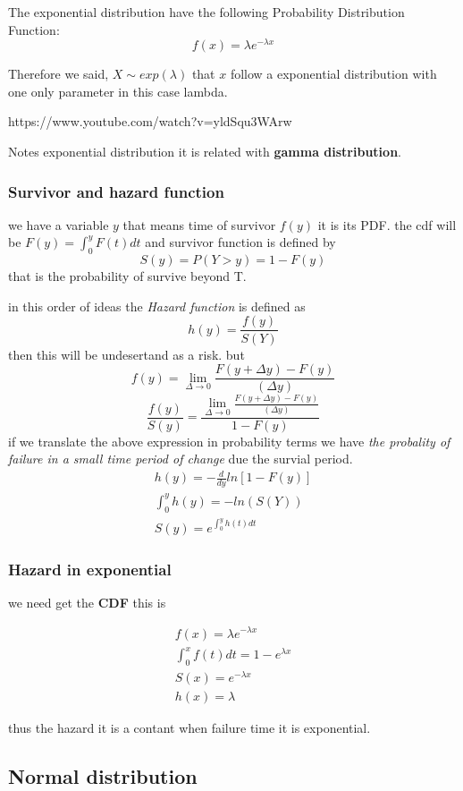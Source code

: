 \documentclass[10pt,a4paper]{article}
\begin{document}
The exponential distribution have the following Probability Distribution Function:
$$f(x)=\lambda e^{- \lambda x}$$
 
Therefore we said, $ X \sim exp(\lambda)$ that $x$ follow a exponential distribution
with one only parameter in this case lambda. 

https://www.youtube.com/watch?v=yldSqu3WArw

Notes exponential distribution it is related with \textbf{gamma distribution}.

\subsubsection{Survivor and hazard function}
we have a variable $y$ that means time of survivor $f(y)$  it is its PDF.
the cdf will be  $F(y)=\int_{0}^{y} F(t)dt$
and survivor function is defined by 
$$S(y)=P(Y>y)= 1-F(y)$$ 
that is the probability of survive beyond T.

in this order of ideas the \textit{Hazard function } is defined as 
$$ h(y)=\frac{f(y)}{S(Y)}$$
then this will be undesertand as a risk.
but 
$$ f(y)=   \lim_{\Delta \to 0}   \frac{   F(y + \Delta y) - F(y)}{(\Delta y)}$$
$$\frac{f(y)}{S(y)}= \frac{\lim_{\Delta \to 0}   \frac{ F(y + \Delta y) - F(y)}{(\Delta y)}}{1-F(y)}$$
if we translate the above expression in probability terms we have \textit{ the probality of failure in a small time period of change} due the survial period.
\begin{eqnarray}
 h(y) =-\frac{d}{dy}ln[1-F(y)] \\
\int_{0}^{y} h(y) = -ln(S(Y)) \\
S(y)=e^{\int_{0}^{y} h(t) dt}
\end{eqnarray}

\subsubsection{Hazard in exponential}
we need get the \textbf{CDF} this is 

\begin{eqnarray*}
f(x)=\lambda e^{- \lambda x }   \\
\int_{0}^{x} f(t)dt= 1 - e^{\lambda x} \\
S(x)=e^{-\lambda x} \\
h(x)= \lambda
\end{eqnarray*}

thus the hazard it is a contant when failure time it is exponential.
\subsection{Normal distribution}
\end{document}
